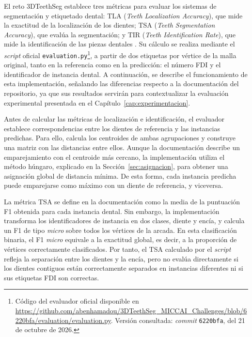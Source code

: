 El reto 3DTeethSeg establece tres métricas para evaluar los sistemas de segmentación y etiquetado dental: TLA (\textit{Teeth Localization Accuracy}), que mide la exactitud de la localización de los dientes; TSA (\textit{Teeth Segmentation Accuracy}), que evalúa la segmentación; y TIR (\textit{Teeth Identification Rate}), que mide la identificación de las piezas dentales \cite{ben-hamadou3DTeethSeg223DTeeth2023}. Su cálculo se realiza mediante el \textit{script} oficial \texttt{evaluation.py}\footnote{Código del evaluador oficial disponible en \url{https://github.com/abenhamadou/3DTeethSeg_MICCAI_Challenges/blob/6220bfa/evaluation/evaluation.py}. Versión consultada: \textit{commit} \texttt{6220bfa}, del 21 de octubre de 2026.}, a partir de dos etiquetas por vértice de la malla original, tanto en la referencia como en la predicción: el número FDI y el identificador de instancia dental. A continuación, se describe el funcionamiento de esta implementación, señalando las diferencias respecto a la documentación del repositorio, ya que sus resultados servirán para contextualizar la evaluación experimental presentada en el Capítulo~\ref{cap:experimentacion}.

Antes de calcular las métricas de localización e identificación, el evaluador establece correspondencias entre los dientes de referencia y las instancias predichas. Para ello, calcula los centroides de ambas agrupaciones y construye una matriz con las distancias entre ellos. Aunque la documentación describe un emparejamiento con el centroide más cercano, la implementación utiliza el método húngaro, explicado en la Sección~\ref{sec:asignacion}, para obtener una asignación global de distancia mínima. De esta forma, cada instancia predicha puede emparejarse como máximo con un diente de referencia, y viceversa.

La métrica TSA se define en la documentación como la media de la puntuación F1 obtenida para cada instancia dental. Sin embargo, la implementación transforma los identificadores de instancia en dos clases, diente y encía, y calcula un F1 de tipo \textit{micro} sobre todos los vértices de la arcada. En esta clasificación binaria, el F1 \textit{micro} equivale a la exactitud global, es decir, a la proporción de vértices correctamente clasificados. Por tanto, el TSA calculado por el \textit{script} refleja la separación entre los dientes y la encía, pero no evalúa directamente si los dientes contiguos están correctamente separados en instancias diferentes ni si sus etiquetas FDI son correctas.

